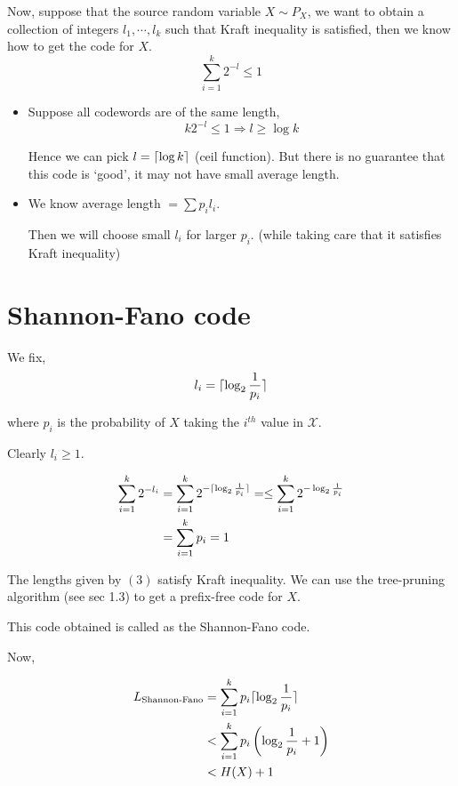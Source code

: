\documentclass{article}
\DeclarePairedDelimiter{\ceil}{\lceil}{\rceil}
\begin{document}
Now, suppose that the source random variable $X \sim P_X$, we want to obtain a collection of integers $l_1, \cdots, l_k$ such that Kraft inequality is satisfied, then we know how to get the code for $X$.
$$ \sum_{i=1}^{k} 2^{-l} \leq 1$$
\begin{itemize}
    \item Suppose all codewords are of the same length, $$ k 2^{-l} \leq 1 \Rightarrow l \geq \log k$$

    Hence we can pick $l = \ceil{\log k}$ (ceil function). But there is no guarantee that this code is `good', it may not have small average length.

    \item We know average length $= \sum p_i l_i$.

    Then we will choose small $l_i$ for larger $p_i$. (while taking care that it satisfies Kraft inequality)
\end{itemize}

\section{Shannon-Fano code}

We fix,
\begin{equation}
    l_i = \ceil{ \log_2 \frac{1}{p_i}}
\end{equation}

 where $p_i$ is the probability of $X$ taking the $i^{th}$ value in $\mathcal{X}$.

Clearly $l_i \geq 1$.

\begin{align*}
    \sum_{i=1}^k 2^{-l_i} &= \sum_{i=1}^k 2^{-\ceil{\log_2 \frac{1}{p_i}}}  =\leq \sum_{i=1}^{k} 2^{- \log_2 \frac{1}{p_i}} \\
    &= \sum_{i=1}^k p_i = 1
\end{align*}

The lengths given by $(3)$ satisfy Kraft inequality. We can use the tree-pruning algorithm (see sec 1.3) to get a prefix-free code for $X$.

This code obtained is called as the Shannon-Fano code.

Now,

\begin{align*}
    L_{\text{Shannon-Fano}} &= \sum_{i=1}^{k} p_i \ceil{\log_2 \frac{1}{p_i}} \\
    &< \sum_{i=1}^{k} p_i \left( \log_2 \frac{1}{p_i} +1 \right) \\
    &< H(X)+1
\end{align*}
\end{document}
